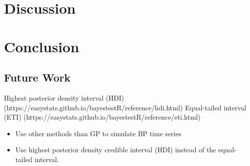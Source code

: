 \chapter{Discussion}





\chapter{Conclusion}

\section{Future Work}


    Highest posterior density interval (HDI) (https://easystats.github.io/bayestestR/reference/hdi.html)
    Equal-tailed interval (ETI) (https://easystats.github.io/bayestestR/reference/eti.html)

\begin{itemize}
    \item Use other methods than GP to simulate BP time series
    \item Use highest posterior density credible interval (HDI) instead of the equal-tailed interval.
\end{itemize}

